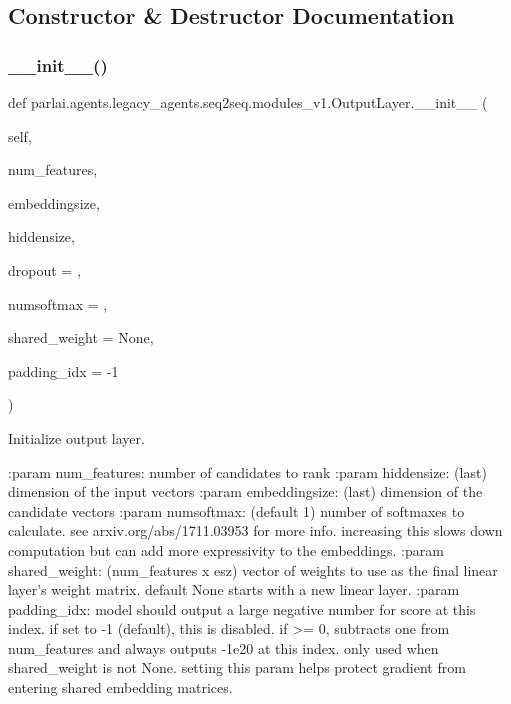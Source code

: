 \subsection{Constructor \& Destructor Documentation}
\mbox{\label{classparlai_1_1agents_1_1legacy__agents_1_1seq2seq_1_1modules__v1_1_1OutputLayer_a616c177990a9bf7ea59eb50ebaeaf2c6}} 
\subsubsection{\texorpdfstring{\+\_\+\+\_\+init\+\_\+\+\_\+()}{\_\_init\_\_()}}
{\footnotesize\ttfamily def parlai.\+agents.\+legacy\+\_\+agents.\+seq2seq.\+modules\+\_\+v1.\+Output\+Layer.\+\_\+\+\_\+init\+\_\+\+\_\+ (\begin{DoxyParamCaption}\item[{}]{self,  }\item[{}]{num\+\_\+features,  }\item[{}]{embeddingsize,  }\item[{}]{hiddensize,  }\item[{}]{dropout = {},  }\item[{}]{numsoftmax = {},  }\item[{}]{shared\+\_\+weight = {\ttfamily None},  }\item[{}]{padding\+\_\+idx = {\ttfamily -\/1} }\end{DoxyParamCaption})}

\begin{DoxyVerb}Initialize output layer.

:param num_features:  number of candidates to rank
:param hiddensize:    (last) dimension of the input vectors
:param embeddingsize: (last) dimension of the candidate vectors
:param numsoftmax:   (default 1) number of softmaxes to calculate.
              see arxiv.org/abs/1711.03953 for more info.
              increasing this slows down computation but can
              add more expressivity to the embeddings.
:param shared_weight: (num_features x esz) vector of weights to use as
              the final linear layer's weight matrix. default
              None starts with a new linear layer.
:param padding_idx:   model should output a large negative number for
              score at this index. if set to -1 (default),
              this is disabled. if >= 0, subtracts one from
              num_features and always outputs -1e20 at this
              index. only used when shared_weight is not None.
              setting this param helps protect gradient from
              entering shared embedding matrices.
\end{DoxyVerb}
 


